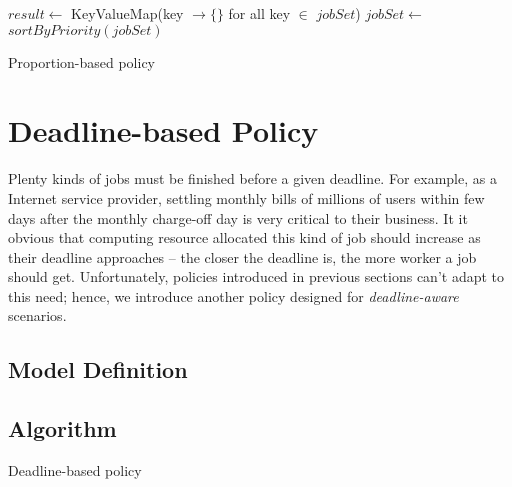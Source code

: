 \begin{algorithm}[H]
  \DontPrintSemicolon %
  $result \gets$ KeyValueMap(key $\to \{\}$ for all key $\in$
  $jobSet$)\;
  $jobSet \gets$ $sortByPriority(jobSet)$\;
  \;
  \caption{Proportion-based policy}
  \label{algo:proportion-based}
\end{algorithm}

\section{Deadline-based Policy}

Plenty kinds of jobs must be finished before a given deadline.
For example, as a Internet service provider, settling monthly bills of
millions of users within few days after the monthly charge-off day is
very critical to their business.
It it obvious that computing resource allocated this kind of job should
increase as their deadline approaches -- the closer the deadline is, the
more worker a job should get.
Unfortunately, policies introduced in previous sections can't adapt to
this need; hence, we introduce another policy designed for
\emph{deadline-aware} scenarios.

\subsection{Model Definition}


\subsection{Algorithm}
\begin{algorithm}[H]
  \DontPrintSemicolon %

  \;
  \caption{Deadline-based policy}
  \label{algo:deadline-based}
\end{algorithm}
